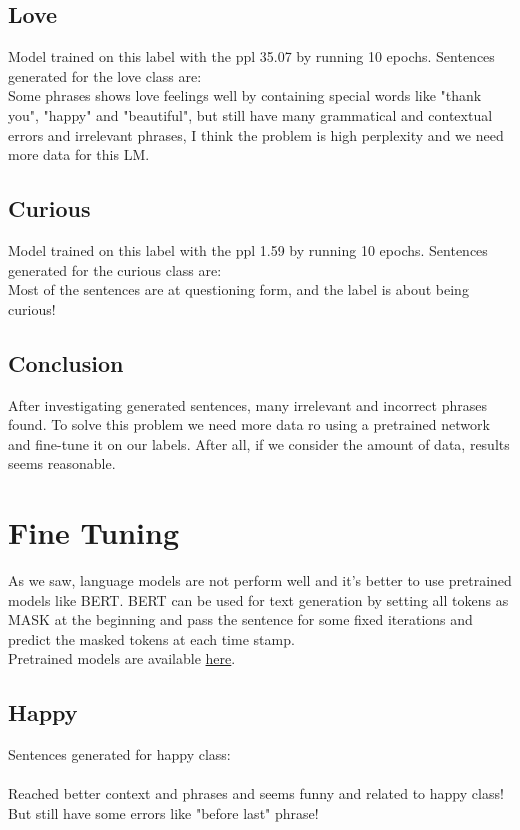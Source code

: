 \documentclass[a4paper]{article}
\begin{document}
\subsection{Love}
Model trained on this label with the ppl 35.07 by running 10 epochs. Sentences generated for the love class are:\\

Some phrases shows love feelings well by containing special words like "thank you", "happy" and "beautiful", but still have many grammatical and contextual errors and irrelevant phrases, I think the problem is high perplexity and we need more data for this LM.\\
\subsection{Curious}
Model trained on this label with the ppl 1.59 by running 10 epochs. Sentences generated for the curious class are:\\

Most of the sentences are at questioning form, and the label is about being curious!\\
\subsection{Conclusion}
After investigating generated sentences, many irrelevant and incorrect phrases found. To solve this problem we need more data ro using a pretrained network and fine-tune it on our labels. After all, if we consider the amount of data, results seems reasonable.\pagebreak
\section{Fine Tuning}
As we saw, language models are not perform well and it's better to use pretrained models like BERT. BERT can be used for text generation by setting all tokens as MASK at the beginning and pass the sentence for some fixed iterations and predict the masked tokens at each time stamp.\cite{wang2019bert}\\
Pretrained models are available \href{https://archive.org/download/NLP_BERT_MODELS}{here}.
\subsection{Happy}
Sentences generated for happy class:\\
\\
Reached better context and phrases and seems funny and related to happy class! But still have some errors like "before last" phrase!
\end{document}
